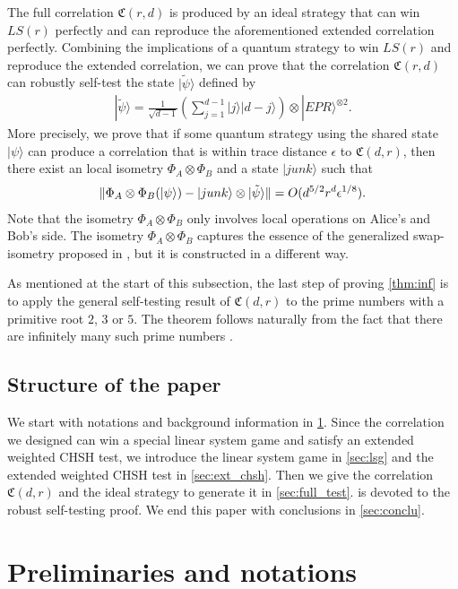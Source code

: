 \documentclass[11pt,letterpaper]{article}
\newcommand{\ket}[1]{|#1\rangle}
\newcommand{\x}{\otimes}
\DeclarePairedDelimiter{\norm}{\lVert}{\rVert}
\newcommand{\1}{\mathbb{1}}
\newcommand{\LS}{LS}
\newcommand{\tpsi}{\tilde{\psi}}
\newcommand{\fC}{\mathfrak{C}}
\newcommand{\ep}{\epsilon}
\theoremstyle{definition}
\begin{document}
The full correlation $\fC(r, d)$ is produced by an ideal strategy
that can win $\LS(r)$ perfectly and 
can reproduce the aforementioned extended correlation perfectly.
Combining the implications of a quantum strategy to win $\LS(r)$
and reproduce the extended correlation, we 
can prove that the correlation $\fC(r, d)$ can robustly self-test the state
$\ket{\tpsi}$ defined by
\begin{align*}
	\ket{\tpsi} = \frac{1}{\sqrt{d-1}} \left( \sum_{j=1}^{d-1} \ket{j}\ket{d-j} \right) \x \ket{EPR}^{\x 2}.
\end{align*}
More precisely, we prove that if some quantum strategy using the shared state
$\ket{\psi}$ can produce a correlation that is within trace distance
$\ep$ to $\fC(d,r)$, then there exist an local isometry
$\Phi_A \x \Phi_B$ and a state $\ket{junk}$ such that
\begin{align}
    \label{eq:distance}
    \norm{\Phi_A\x\Phi_B(\ket{\psi}) - \ket{junk}\x \ket{\tpsi}} = O(d^{5/2} r^d \ep^{1/8}).
\end{align}
Note that the isometry $\Phi_A \x \Phi_B$ only involves local operations
on Alice's and Bob's side.
The isometry $\Phi_A \x \Phi_B$ captures the essence of the generalized 
swap-isometry proposed in \cite{yang2013}, but it is constructed in a different way.

As mentioned at the start of this subsection, the last step of proving \cref{thm:inf} is to apply the general self-testing result of
$\fC(d,r)$ to the prime numbers with a primitive root $2$, $3$ or $5$.
The theorem follows naturally from the fact that there are infinitely many such
prime numbers \cite{murty1988}.



\subsection{Structure of the paper}
We start with notations and background information in \cref{sec:prelim}.
Since the correlation we designed can win a special linear system game and satisfy
an extended weighted CHSH test, we introduce the linear system game
in \cref{sec:lsg} and the extended weighted CHSH test in \cref{sec:ext_chsh}. 
Then we give the correlation $\fC(d,r)$ and the ideal strategy to generate it in \cref{sec:full_test}.
 is devoted to the robust self-testing proof. We end this paper with conclusions
in \cref{sec:conclu}. 

\section{Preliminaries and notations}
\label{sec:prelim}
\end{document}
